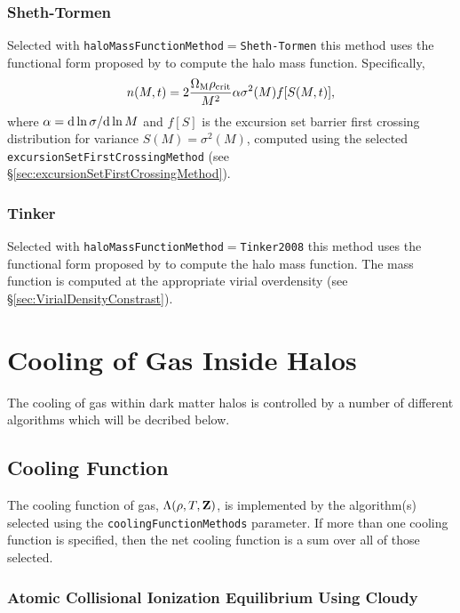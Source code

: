 \subsubsection{Sheth-Tormen}

Selected with {\tt haloMassFunctionMethod}$=${\tt Sheth-Tormen} this method uses the functional form proposed by \cite{sheth_ellipsoidal_2001} to compute the halo mass function. Specifically,
\begin{equation}
n(M,t) = 2 {\Omega_{\rm M} \rho_{\rm crit} \over M^2} \alpha \sigma^2(M) f[S(M,t)],
\end{equation}
where $\alpha = {\rm d}\ln\sigma/{\rm d}\ln M$ and $f[S]$ is the excursion set barrier first crossing distribution for variance $S(M)=\sigma^2(M)$, computed using the selected {\tt excursionSetFirstCrossingMethod} (see \S\ref{sec:excursionSetFirstCrossingMethod}).

\subsubsection{Tinker}

Selected with {\tt haloMassFunctionMethod}$=${\tt Tinker2008} this method uses the functional form proposed by \cite{tinker_towardhalo_2008} to compute the halo mass function. The mass function is computed at the appropriate virial overdensity (see \S\ref{sec:VirialDensityConstrast}).

\section{Cooling of Gas Inside Halos}

The cooling of gas within dark matter halos is controlled by a number of different algorithms which will be decribed below.

\subsection{Cooling Function}

The cooling function of gas, $\Lambda(\rho,T,{\bf Z})$, is implemented by the algorithm(s) selected using the {\tt coolingFunctionMethods} parameter. If more than one cooling function is specified, then the net cooling function is a sum over all of those selected.

\subsubsection{Atomic Collisional Ionization Equilibrium Using {\sc Cloudy}}

